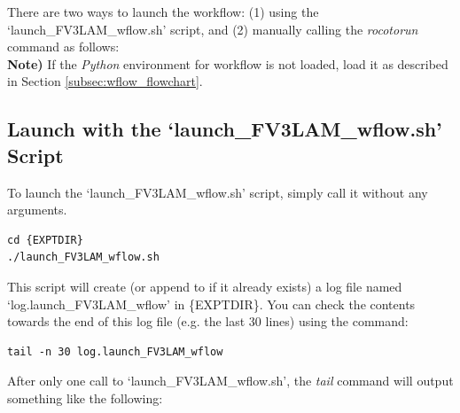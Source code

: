 \documentclass[11pt,fleqn]{report}              %
\begin{document}
There are two ways to launch the workflow: (1) using the `launch\_FV3LAM\_wflow.sh' script, and (2) manually calling the {\it rocotorun} command as follows: \\

{\bf Note)} If the {\it Python} environment for workflow is not loaded, load it as described in Section \ref{subsec:wflow_flowchart}.


\subsection{Launch with the `launch\_FV3LAM\_wflow.sh' Script}
\label{subsec:launch_script}

To launch the `launch\_FV3LAM\_wflow.sh' script, simply call it without any arguments. 
\lstset{language=bash}   
\begin{lstlisting}[frame=trBL]
cd {EXPTDIR}
./launch_FV3LAM_wflow.sh
\end{lstlisting}

This script will create (or append to if it already exists) a log file named `log.launch\_FV3LAM\_wflow' in \{EXPTDIR\}. You can check the contents towards the end of this log file (e.g. the last 30 lines) using the command:

\lstset{language=bash}   
\begin{lstlisting}[frame=trBL]
tail -n 30 log.launch_FV3LAM_wflow
\end{lstlisting}

After only one call to `launch\_FV3LAM\_wflow.sh', the {\it tail} command will output something like the following:
\end{document}
